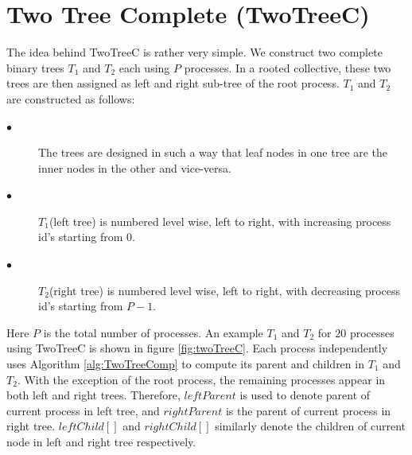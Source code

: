 \documentclass[sigplan,review,anonymous]{acmart}\settopmatter{printfolios=true,printccs=false,printacmref=false}
\begin{document}


\section{Two Tree Complete (TwoTreeC)}\label{sec:TwoTreeC}
The idea behind TwoTreeC is rather very simple. We construct two complete binary trees $T_1$ and $T_2$ each using $P$ processes. In a rooted collective, these two trees are then assigned as left and right sub-tree of the root process. $T_1$ and $T_2$ are constructed as follows:
\begin{description}
    \item[$\bullet$]The trees are designed in such a way that leaf nodes in one tree are the inner nodes in the other and vice-versa.
    \item[$\bullet$]$T_1$(left tree) is numbered level wise, left to right, with increasing process id's starting from $0$.
    \item[$\bullet$]$T_2$(right tree) is numbered level wise, left to right, with decreasing process id's starting from $P-1$.
\end{description}
Here $P$ is the total number of processes. An example $T_1$ and $T_2$ for $20$ processes using TwoTreeC is shown in figure \ref{fig:twoTreeC}. Each process independently uses Algorithm \ref{alg:TwoTreeComp} to compute its parent and children in $T_1$ and $T_2$. With the exception of the root process, the remaining processes appear in both left and right trees. Therefore, $leftParent$ is used to denote parent of current process in left tree, and $rightParent$ is the parent of current process in right tree. $leftChild[]$ and $rightChild[]$ similarly denote the children of current node in left and right tree respectively. 
\end{document}
